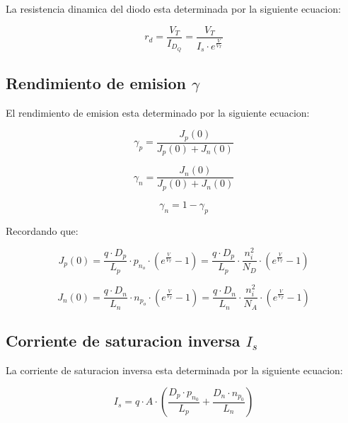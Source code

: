 \documentclass[../main.tex]{subfiles}
\begin{document}
	La resistencia dinamica del diodo esta determinada por la siguiente ecuacion:
	
	\Large
	\begin{equation}
		r_d = \frac{V_T}{I_{D_Q}} = \frac{V_T}{I_s \cdot e^{\frac{V}{V_T}}} 
	\end{equation}
	
	\normalsize
	\subsection{Rendimiento de emision $\gamma$}
	
	El rendimiento de emision esta determinado por la siguiente ecuacion:
	
	\begin{equation}
		\gamma_p = \frac{J_p(0)}{J_p(0) + J_n(0)} 
	\end{equation}
	
	\begin{equation}
		\gamma_n = \frac{J_n(0)}{J_p(0) + J_n(0)} 
	\end{equation}
	
	\begin{equation}
		\gamma_n = 1 - \gamma_p
	\end{equation}

	Recordando que:
	
	\begin{equation}
		J_p(0) = \frac{q \cdot D_p}{L_p} \cdot p_{n_o} \cdot \left( e^\frac{V}{V_T} - 1\right) = \frac{q \cdot D_p}{L_p} \cdot \frac{n_i^2}{N_D} \cdot \left( e^\frac{V}{V_T} - 1\right)
	\end{equation}
	
	\begin{equation}
		J_n(0) = \frac{q \cdot D_n}{L_n} \cdot n_{p_o} \cdot \left( e^{\frac{V}{V_T}} -1 \right) = \frac{q \cdot D_n}{L_n} \cdot \frac{n_i^2}{N_A} \cdot \left( e^\frac{V}{V_T} - 1\right)
	\end{equation}
	
	\normalsize
	\subsection{Corriente de saturacion inversa $I_s$}
	
	La corriente de saturacion inversa esta determinada por la siguiente ecuacion:
	
	\begin{equation}
		I_s = q \cdot A \cdot \left( \frac{D_p \cdot p_{n_0}}{L_p} + \frac{D_n \cdot n_{p_0}}{L_n}\right) 
	\end{equation}
	
	
	
\end{document}

